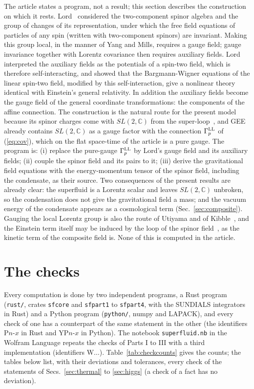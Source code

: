 \documentclass[aps,prd,onecolumn,superscriptaddress,nofootinbib,floatfix,longbibliography]{revtex4-2}
\newcommand{\LL}{{\rm LL}}
\begin{document}
The article states a program, not a result; this section describes the construction on which it rests. Lord~\cite{Lord1971} considered
the two-component spinor algebra and the group of changes of its representation, under which the free field equations of particles of
any spin (written with two-component spinors) are invariant. Making this group local, in the manner of Yang and Mills, requires a gauge
field; gauge invariance together with Lorentz covariance then requires auxiliary fields. Lord interpreted the auxiliary fields as the
potentials of a spin-two field, which is therefore self-interacting, and showed that the Bargmann-Wigner equations of the linear spin-two
field, modified by this self-interaction, give a nonlinear theory identical with Einstein's general relativity. In addition the auxiliary
fields become the gauge field of the general coordinate transformations: the components of the affine connection. The construction is the
natural route for the present model because its spinor charges come with $SL(2,\mathbb C)$ from the super-loop~\cite{Nash2026}, and GEE
already contains $SL(2,\mathbb C)$ as a gauge factor with the connection $\Gamma^\LL_p$ of (\ref{eq:cov}), which on the flat space-time of
the article is a pure gauge. The program is: (i) replace the pure-gauge $\Gamma^\LL_p$ by Lord's gauge field and its auxiliary fields;
(ii) couple the spinor field and its pairs to it; (iii) derive the gravitational field equations with the energy-momentum tensor of the
spinor field, including the condensate, as their source. Two consequences of the present results are already clear: the superfluid is a
Lorentz scalar and leaves $SL(2,\mathbb C)$ unbroken, so the condensation does not give the gravitational field a mass; and the vacuum
energy of the condensate appears as a cosmological term (Sec.~\ref{sec:composite}). Gauging the local Lorentz group is also the route of
Utiyama and of Kibble~\cite{Utiyama1956,Kibble1961,Hehl1976}, and the Einstein term itself may be induced by the loop of the spinor
field~\cite{Sakharov1967,Visser2002}, as the kinetic term of the composite field is. None of this is computed in the article.

\section{The checks}
\label{sec:checks}

Every computation is done by two independent programs, a Rust program (\texttt{rust/}, crates \texttt{sfcore} and
\texttt{sfpart1} to \texttt{sfpart4}, with the SUNDIALS integrators in Rust) and a Python program (\texttt{python/}, numpy and
LAPACK), and every check of one has a counterpart of the same statement in the other (the identifiers P$n$-$x$ in Rust and YP$n$-$x$
in Python). The notebook \texttt{superfluid.nb} in the Wolfram Language repeats the checks of Parts I to III with a third
implementation (identifiers W$\dots$). Table~\ref{tab:checkcounts} gives the counts; the tables below list, with their deviations and
tolerances, every check of the statements of Secs.~\ref{sec:thermal} to \ref{sec:higgs} (a check of a fact has no deviation).
\end{document}
